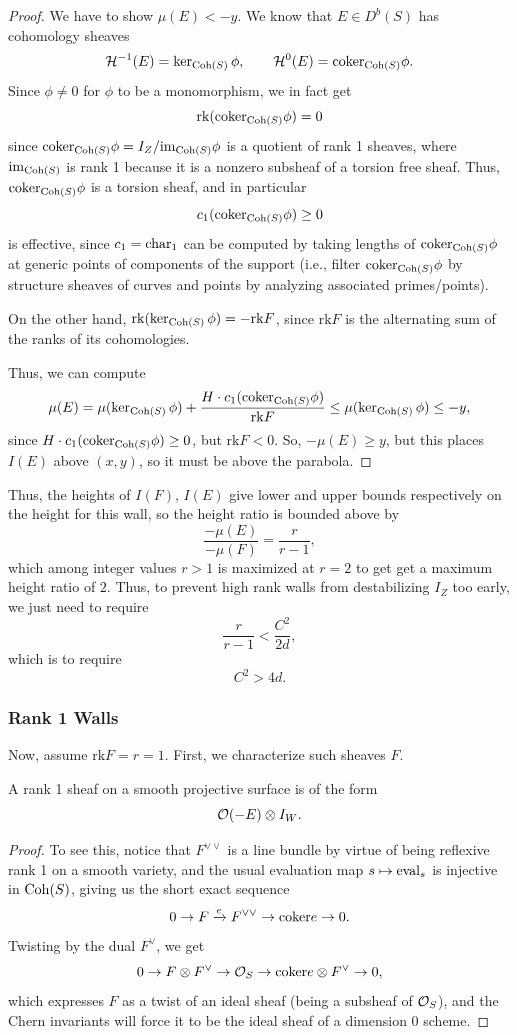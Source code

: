 \documentclass[12pt]{article}
\newcommand{\rk}{\mathrm{rk}}
\begin{document}
\begin{proof}
    We have to show $\mu(E)<-y$. We know that $E\in D^b(S)$ has cohomology sheaves
    \[\cH^{-1}(E) = \ker_{\Coh(S)} \phi, \qquad \cH^0(E) = \coker_{\Coh(S)} \phi.\]
    Since $\phi\neq 0$ for $\phi$ to be a monomorphism, we in fact get
    \[\rk(\coker_{\Coh(S)} \phi) = 0\]
    since $\coker_{\Coh(S)} \phi = I_Z/\im_{\Coh(S)} \phi$ is a quotient of rank 1 sheaves, where $\mathrm{im}_{\operatorname{Coh}(S)}$ is rank 1 because it is a nonzero subsheaf of a torsion free sheaf. Thus, $\coker_{\Coh(S)} \phi$ is a torsion sheaf, and in particular
    \[c_1(\coker_{\Coh(S)} \phi) \geq 0\]
    is effective, since $c_1=\mathrm{char}_1$ can be computed by taking lengths of $\coker_{\Coh(S)} \phi$ at generic points of components of the support (i.e., filter $\coker_{\Coh(S)} \phi$ by structure sheaves of curves and points by analyzing associated primes/points).

    On the other hand, $\rk(\ker_{\Coh(S)} \phi) = -\rk F$, since $\rk F$ is the alternating sum of the ranks of its cohomologies.

    Thus, we can compute
    \[\mu(E) = \mu(\ker_{\Coh(S)} \phi) + \frac{H\cdot c_1(\coker_{\Coh(S)} \phi)}{\rk F} \leq \mu(\ker_{\Coh(S)} \phi) \leq -y,\]
    since $H\cdot c_1(\coker_{\Coh(S)} \phi)\geq 0$, but $\rk F<0$. So, $-\mu(E) \geq y$, but this places $I(E)$ above $(x,y)$, so it must be above the parabola.
\end{proof}

Thus, the heights of $I(F)$, $I(E)$ give lower and upper bounds respectively on the height for this wall, so the height ratio is bounded above by
\[\frac{-\mu(E)}{-\mu(F)} = \frac{r}{r-1},\]
which among integer values $r>1$ is maximized at $r=2$ to get get a maximum height ratio of $2$. Thus, to prevent high rank walls from destabilizing $I_Z$ too early, we just need to require
\[\frac{r}{r-1} < \frac{C^2}{2d},\]
which is to require
\[C^2 > 4d.\]

\subsubsection{Rank 1 Walls}

Now, assume $\rk F = r = 1$. First, we characterize such sheaves $F$.

\begin{lem}
    A rank 1 sheaf on a smooth projective surface is of the form
    \[\mathcal{O}(-E)\otimes I_W.\]
\end{lem}
\begin{proof}
    To see this, notice that $F^{\vee \vee}$ is a line bundle by virtue of being reflexive rank 1 on a smooth variety, and the usual evaluation map $s \mapsto \mathrm{eval}_s$ is injective in $\operatorname{Coh}(S)$, giving us the short exact sequence
    \[0\to F \xrightarrow{e} F^{\vee \vee} \to \mathrm{coker} e \to 0.\]
    Twisting by the dual $F^{\vee}$, we get
    \[0\to F \otimes F^{\vee} \to \mathcal{O}_S \to \mathrm{coker} e \otimes F^{\vee} \to 0,\]
    which expresses $F$ as a twist of an ideal sheaf (being a subsheaf of $\mathcal{O}_S$), and the Chern invariants will force it to be the ideal sheaf of a dimension 0 scheme.
\end{proof}
\end{document}
